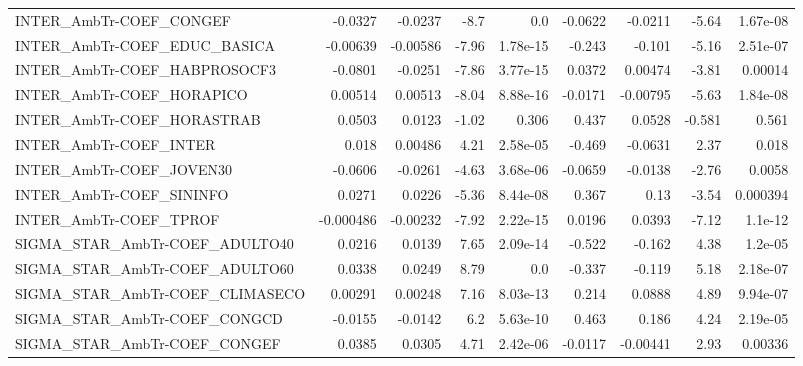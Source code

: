 \begin{tabular}{lrrrrrrrr}
INTER\_AmbTr-COEF\_CONGEF           &     -0.0327 &      -0.0237 &    -8.7 &      0.0 &    -0.0622 &     -0.0211 &        -5.64 &      1.67e-08 \\
INTER\_AmbTr-COEF\_EDUC\_BASICA      &    -0.00639 &     -0.00586 &   -7.96 & 1.78e-15 &     -0.243 &      -0.101 &        -5.16 &      2.51e-07 \\
INTER\_AmbTr-COEF\_HABPROSOCF3      &     -0.0801 &      -0.0251 &   -7.86 & 3.77e-15 &     0.0372 &     0.00474 &        -3.81 &       0.00014 \\
INTER\_AmbTr-COEF\_HORAPICO         &     0.00514 &      0.00513 &   -8.04 & 8.88e-16 &    -0.0171 &    -0.00795 &        -5.63 &      1.84e-08 \\
INTER\_AmbTr-COEF\_HORASTRAB        &      0.0503 &       0.0123 &   -1.02 &    0.306 &      0.437 &      0.0528 &       -0.581 &         0.561 \\
INTER\_AmbTr-COEF\_INTER            &       0.018 &      0.00486 &    4.21 & 2.58e-05 &     -0.469 &     -0.0631 &         2.37 &         0.018 \\
INTER\_AmbTr-COEF\_JOVEN30          &     -0.0606 &      -0.0261 &   -4.63 & 3.68e-06 &    -0.0659 &     -0.0138 &        -2.76 &        0.0058 \\
INTER\_AmbTr-COEF\_SININFO          &      0.0271 &       0.0226 &   -5.36 & 8.44e-08 &      0.367 &        0.13 &        -3.54 &      0.000394 \\
INTER\_AmbTr-COEF\_TPROF            &   -0.000486 &     -0.00232 &   -7.92 & 2.22e-15 &     0.0196 &      0.0393 &        -7.12 &       1.1e-12 \\
SIGMA\_STAR\_AmbTr-COEF\_ADULTO40    &      0.0216 &       0.0139 &    7.65 & 2.09e-14 &     -0.522 &      -0.162 &         4.38 &       1.2e-05 \\
SIGMA\_STAR\_AmbTr-COEF\_ADULTO60    &      0.0338 &       0.0249 &    8.79 &      0.0 &     -0.337 &      -0.119 &         5.18 &      2.18e-07 \\
SIGMA\_STAR\_AmbTr-COEF\_CLIMASECO   &     0.00291 &      0.00248 &    7.16 & 8.03e-13 &      0.214 &      0.0888 &         4.89 &      9.94e-07 \\
SIGMA\_STAR\_AmbTr-COEF\_CONGCD      &     -0.0155 &      -0.0142 &     6.2 & 5.63e-10 &      0.463 &       0.186 &         4.24 &      2.19e-05 \\
SIGMA\_STAR\_AmbTr-COEF\_CONGEF      &      0.0385 &       0.0305 &    4.71 & 2.42e-06 &    -0.0117 &    -0.00441 &         2.93 &       0.00336 \\

\end{tabular}
